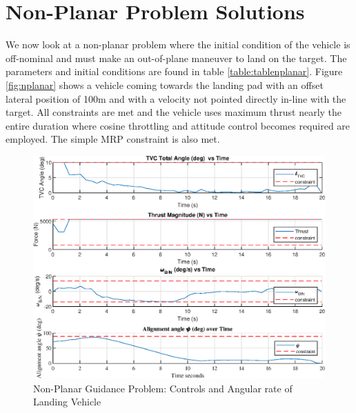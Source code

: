 \section{Non-Planar Problem Solutions}
We now look at a non-planar problem where the initial condition of the vehicle is off-nominal and must make an out-of-plane maneuver to land on the target. The parameters and initial conditions are found in table \ref{table:tablenplanar}. Figure \ref{fig:nplanar} shows a vehicle coming towards the landing pad with an offset lateral position of 100m and with a velocity not pointed directly in-line with the target. All constraints are met and the vehicle uses maximum thrust nearly the entire duration where cosine throttling and attitude control becomes required are employed. The simple MRP constraint is also met.

\begin{figure}[!htbp] 
  \centering
  \includegraphics[width=\textwidth]{figs/nonplanar_controls.eps}
  \caption{Non-Planar Guidance Problem: Controls and Angular rate of Landing Vehicle}
  \label{fig:nplanarcontrols}
 \end{figure}

